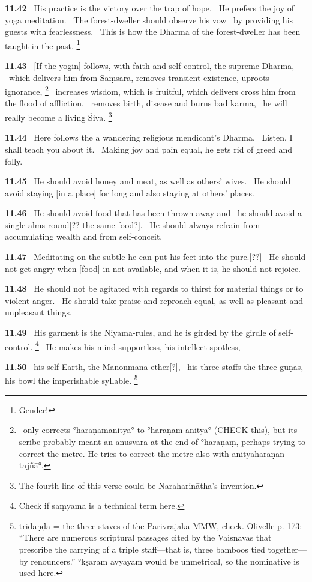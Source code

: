 \documentclass{article}
\begin{document}
\textbf{11.42}%
\ His practice is the victory over the trap of hope.%
\              He prefers the joy of yoga meditation.%
\ The forest-dweller should observe his vow%
\              by providing his guests with fearlessness.%
\ This is how the Dharma of the forest-dweller has been taught in the past.%
\footnote{Gender! }%


\textbf{11.43}%
\ [If the yogin] follows, with faith and self-control, the supreme Dharma,%
\              which delivers him from Saṃsāra, removes transient existence, uproots ignorance,%
\footnote{\msNa\ only corrects °haraṇamanitya° to °haraṇam anitya° (CHECK this),                but its scribe probably meant an anusvāra at the end of °haraṇaṃ,                perhaps trying to correct the metre. He tries to correct the metre               also with anityaharaṇan tajñā°. }%
\ increases wisdom, which is fruitful, which delivers cross him from the flood of affliction,%
\ removes birth, disease and burns bad karma,%
\ he will really become a living Śiva.%
\footnote{The fourth line of this verse could be Naraharinātha's invention. }%


\textbf{11.44}%
\ Here follows the a wandering religious mendicant's Dharma.%
\              Listen, I shall teach you about it.%
\ Making joy and pain equal, he gets rid of greed and folly.%


\textbf{11.45}%
\ He should avoid honey and meat, as well as others' wives.%
\ He should avoid staying [in a place] for long and also staying at others' places.%


\textbf{11.46}%
\ He should avoid food that has been thrown away and%
\                  he should avoid a single alms round[?? the same food?].%
\ He should always refrain from accumulating wealth and from self-conceit.%


\textbf{11.47}%
\ Meditating on the subtle he can put his feet into the pure.[??]%
\ He should not get angry when [food] in not available, and when it is, he should not rejoice.%


\textbf{11.48}%
\ He should not be agitated with regards to thirst for material things or to violent anger.%
\ He should take praise and reproach equal, as well as pleasant and unpleasant things.%


\textbf{11.49}%
\ His garment is the Niyama-rules, and he is girded by the girdle of self-control.%
\footnote{Check if saṃyama is a technical term here. }%
\ He makes his mind supportless, his intellect spotless,%


\textbf{11.50}%
\ his self Earth, the Manonmana ether[?],%
\ his three staffs the three guṇas, his bowl the imperishable syllable.%
\footnote{tridaṇḍa = the three staves of the Parivrājaka MMW, check.                 Olivelle p. 173: ``There are numerous scriptural passages cited                  by the Vaisnavas that prescribe the carrying of a triple staff---that is,                 three bamboos tied together---by renouncers.''              °kṣaram avyayam would be unmetrical, so the nominative is used here. }%
\end{document}
